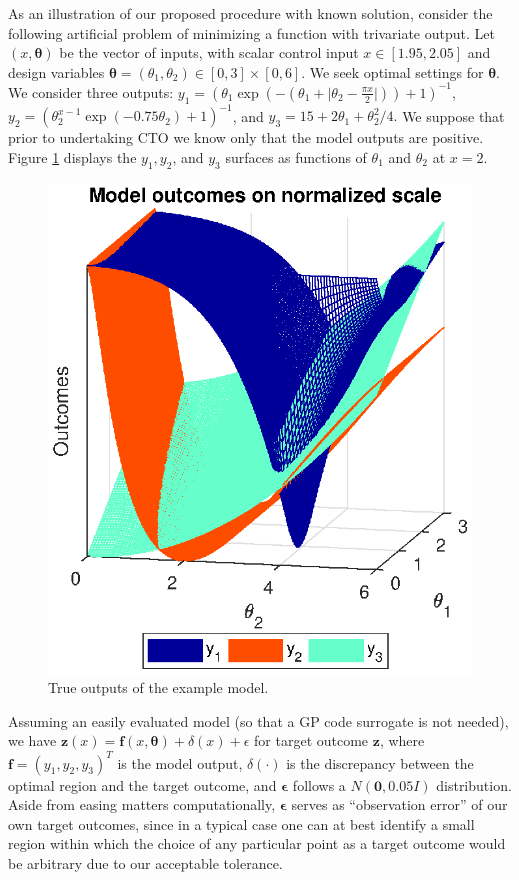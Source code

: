 \documentclass[12pt]{article}
\begin{document}
%
As an illustration of our proposed procedure with known solution, consider the following artificial problem of minimizing a function with trivariate output. 
%
Let $(x,\boldsymbol \theta)$ be the vector of inputs, with scalar control input $x\in[1.95,2.05]$ and design variables $\boldsymbol \theta = (\theta_1,\theta_2)\in[0,3]\times[0,6]$.
%
We seek optimal settings for $\boldsymbol\theta$.
%
We consider three outputs:
%
$
y_1 = \left(\theta_1 \exp\left(-\left(\theta_1 + \lvert \theta_2-\frac{\pi x}2\rvert \right)\right)+1\right)^{-1}$, 
$
y_2 = \left(\theta_2^{x-1} \exp\left(-0.75 \theta_2\right) + 1 \right)^{-1}
$, and
$
y_3 = 15 + 2 \theta_1 + {\theta_2^2}/4.
$
%
We suppose that prior to undertaking CTO we know only that the model outputs are positive.
%
Figure \ref{fig:toy_sim_outputs} displays the $y_1, y_2$, and $y_3$ surfaces as functions of $\theta_1$ and $\theta_2$ at $x = 2$.
%
\begin{figure}
\centering
\includegraphics[scale=.8]{FIG_toy_sim_model_outputs.eps}
\caption{True outputs of the example model.}
\label{fig:toy_sim_outputs}
\end{figure}
%
Assuming an easily evaluated model (so that a GP code surrogate is not needed), we have
%
$
\mathbf z(x) = \mathbf f(x,\boldsymbol \theta) + \delta(x) + \epsilon
$
%
for target outcome $\mathbf z$, where $\mathbf f = (y_1,y_2,y_3)^T$ is the model output, $\delta(\cdot)$ is the discrepancy between the optimal region and the target outcome, and $\boldsymbol \epsilon$ follows a $N(\mathbf 0,0.05I)$ distribution. 
%
Aside from easing matters computationally, $\boldsymbol \epsilon$ serves as ``observation error'' of our own target outcomes, since in a typical case one can at best identify a small region within which the choice of any particular point as a target outcome would be arbitrary due to our acceptable tolerance.
%
\end{document}
